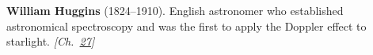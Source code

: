 \textbf{William Huggins} (1824–1910). English astronomer who established astronomical spectroscopy and was the first to apply the Doppler effect to starlight. \emph{[Ch.~\hyperref[ch:planetaryskycolors]{27}]}

